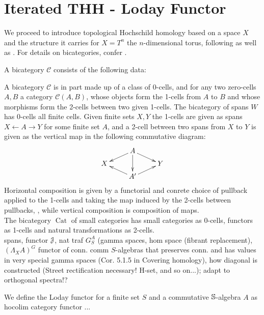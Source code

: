 \section{Iterated THH - Loday Functor}
  We proceed to introduce topological Hochschild homology based on a space $X$ and the structure it carries for $X = T^n$ the $n$-dimensional torus, following \cite{brun2010covering} as well as \cite{carlsson2011higher}. For details on bicategories, confer \cite{benabou1967introduction}.\\
  \begin{defn}
    A bicategory $\mathcal{C}$ consists of the following data:
  \end{defn}
  A bicategory $\mathcal{C}$ is in part made up of a class of 0-cells, and for any two zero-cells $A,B$ a category $\mathcal{C}(A,B)$, whose objects form the 1-cells from $A$ to $B$ and whose morphisms form the 2-cells between two given 1-cells. The bicategory of spans $W$ has 0-cells all finite cells. Given finite sets $X,Y$ the 1-cells are given as spans $ X \leftarrow A \rightarrow Y$ for some finite set $A$, and a 2-cell between two spans from $X$ to $Y$  is given as the vertical map in the following commutative diagram:
  \[
  \xymatrix@R-=.5em{
    &
    A \ar[dl] \ar[dd] \ar[dr]
    \\
    X
    &
    &
    Y
    \\
    &
    A^\prime \ar[ul] \ar[ur]
    &
  }
  \]
  Horizontal composition is given by a functorial and conrete choice of pullback applied to the 1-cells and taking the map induced by the 2-cells between pullbacks, , while vertical composition is composition of maps.\\
  The bicategory $\operatorname{Cat}$ of small categories has small categories as 0-cells, functors as 1-cells and natural transformations as 2-cells.
  \\
  spans, functor $\mathcal{J}$, nat traf $G^A_S$ (gamma spaces, hom space (fibrant replacement), $(\Lambda_X A)^G$ functor of conn. comm $S$-algebras that preserves conn. and has values in very special gamma spaces (Cor. 5.1.5 in Covering homology), how diagonal is constructed (Street rectification necessary! H-set, and so on...); adapt to orthogonal spectra!?
  \begin{defn}\label{def_loday_functor}
    We define the Loday functor for a finite set $S$ and a commutative $\mathbb{S}$-algebra $A$ as hocolim category functor ...

  \end{defn}

